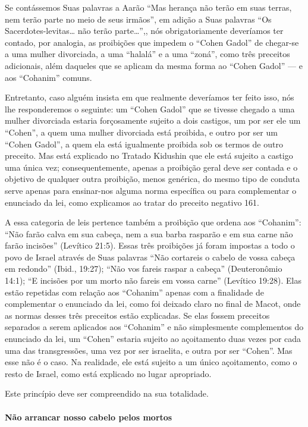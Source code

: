 Se contássemos Suas palavras a Aarão ``Mas herança não terão em suas
terras, nem terão parte no meio de seus irmãos'', em adição a Suas
palavras ``Os Sacerdotes-levitas\ldots{} não terão parte\ldots{}'',, nós
obrigatoriamente deveríamos ter contado, por analogia, as proibições
que impedem o ``Cohen Gadol'' de chegar-se a uma mulher divorciada, a
uma ``halalá'' e a uma ``zoná'', como três preceitos adicionais, além
daqueles que se aplicam da mesma forma ao ``Cohen Gadol'' --- e aos
``Cohanim'' comuns.

Entretanto, caso alguém insista em que realmente deveríamos ter feito
isso, nós lhe responderemos o seguinte: um ``Cohen
Gadol'' que se tivesse chegado a uma mulher divorciada estaria
forçosamente sujeito a dois castigos, um por ser ele um ``Cohen'', a
quem uma mulher divorciada está proibida, e outro por ser um ``Cohen
Gadol'', a quem ela está igualmente proibida sob os termos de outro
preceito. Mas está explicado no Tratado Kidushin que ele está sujeito a
castigo uma única vez; consequentemente, apenas a proibição geral deve
ser contada e o objetivo de qualquer outra proibição, menos genérica, do
mesmo tipo de conduta serve apenas para ensinar-nos alguma norma
específica ou para complementar o enunciado da lei, como explicamos ao
tratar do preceito negativo 161.

A essa categoria de leis pertence também a proibição que ordena aos
``Cohanim'': ``Não farão calva em sua cabeça, nem a sua barba rasparão e
em sua carne não farão incisões'' (Levítico 21:5). Essas três proibições
já foram impostas a todo o povo de Israel através de Suas palavras
``Não cortareis o cabelo de vossa cabeça em redondo'' (Ibid., 19:27);
``Não vos fareis raspar a cabeça'' (Deuteronômio 14:1); ``E incisões por
um morto não fareis em vossa carne'' (Levítico 19:28). Elas estão
repetidas com relação aos ``Cohanim'' apenas com a finalidade de
complementar o enunciado da lei, como foi deixado claro no final de
Macot, onde as normas desses três preceitos estão explicadas. Se elas
fossem preceitos separados a serem aplicados aos ``Cohanim'' e não
simplesmente complementos do enunciado da lei, um ``Cohen'' estaria
sujeito ao açoitamento duas vezes por cada uma das transgressões, uma
vez por ser israelita, e outra por ser ``Cohen''. Mas esse não é o caso.
Na realidade, ele está sujeito a um único açoitamento, como o resto de
Israel, como está explicado no lugar apropriado.

Este princípio deve ser compreendido na sua totalidade.

\paragraph{Não arrancar nosso cabelo pelos mortos}


